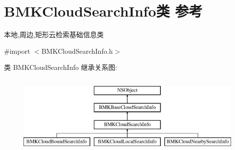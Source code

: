 \hypertarget{interface_b_m_k_cloud_search_info}{}\section{B\+M\+K\+Cloud\+Search\+Info类 参考}
\label{interface_b_m_k_cloud_search_info}


本地,周边,矩形云检索基础信息类  




{\ttfamily \#import $<$B\+M\+K\+Cloud\+Search\+Info.\+h$>$}

类 B\+M\+K\+Cloud\+Search\+Info 继承关系图\+:\begin{figure}[H]
\begin{center}
\leavevmode
\includegraphics[height=4.000000cm]{interface_b_m_k_cloud_search_info}
\end{center}
\end{figure}
